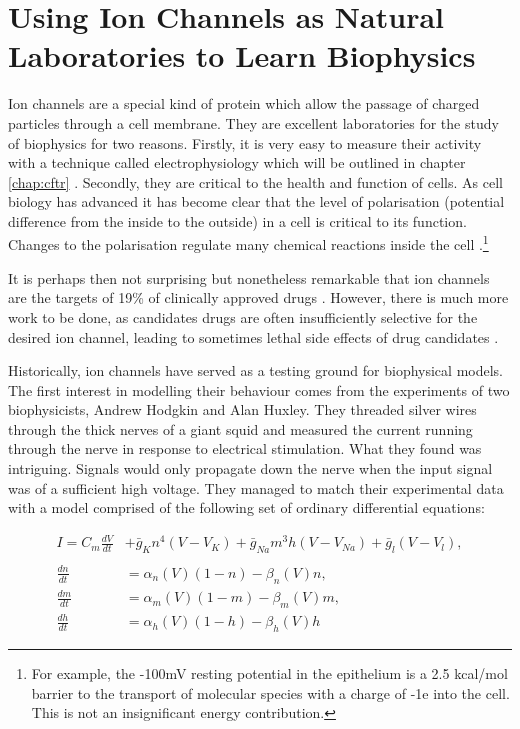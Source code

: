 \section{Using Ion Channels as Natural Laboratories to Learn Biophysics}

Ion channels are a special kind of protein which allow the passage of charged particles through a cell membrane. They are excellent laboratories for the study of biophysics for two reasons. Firstly, it is very easy to measure their activity with a technique called electrophysiology which will be outlined in chapter \ref{chap:cftr} \cite{hille2001}. Secondly, they are critical to the health and function of cells. As cell biology has advanced it has become clear that the level of polarisation (potential difference from the inside to the outside) in a cell is critical to its function. Changes to the polarisation regulate many chemical reactions inside the cell \cite{catterall2011, muthuswamy2012, levin2014, levin2014a}.\footnote{For example, the -100mV resting potential in the epithelium is a 2.5 kcal/mol barrier to the transport of molecular species with a charge of -1e into the cell. This is not an insignificant energy contribution.}

It is perhaps then not surprising but nonetheless remarkable that ion channels are the targets of 19\% of clinically approved drugs \cite{santos2017}. However, there is much more work to be done, as candidates drugs are often insufficiently selective for the desired ion channel, leading to sometimes lethal side effects of drug candidates \cite{stansfeld2006, kaczorowski2008, waszkielewicz2013}.

Historically, ion channels have served as a testing ground for biophysical models. The first interest in modelling their behaviour comes from the experiments of two biophysicists, Andrew Hodgkin and Alan Huxley. They threaded silver wires through the thick nerves of a giant squid and measured the current running through the nerve in response to electrical stimulation. What they found was intriguing. Signals would only propagate down the nerve when the input signal was of a sufficient high voltage. They managed to match their experimental data with a model comprised of the following set of ordinary differential equations:

\begin{equation}
	\label{hh_equations}
\begin{aligned}
	I = C_m \frac{dV}{dt} &+ \bar{g}_K n^4 (V - V_K) + \bar{g}_{Na} m^3 h (V - V_{Na} ) + \bar{g}_l (V-V_l) , \\ \\
	\frac{dn}{dt} &= \alpha_n(V)  (1-n) - \beta_n(V)  n, \\
	\frac{dm}{dt} &= \alpha_m(V)  (1-m) - \beta_m(V)  m, \\ 
	\frac{dh}{dt} &= \alpha_h(V)  (1-h) - \beta_h(V)  h  
\end{aligned}
\end{equation}

